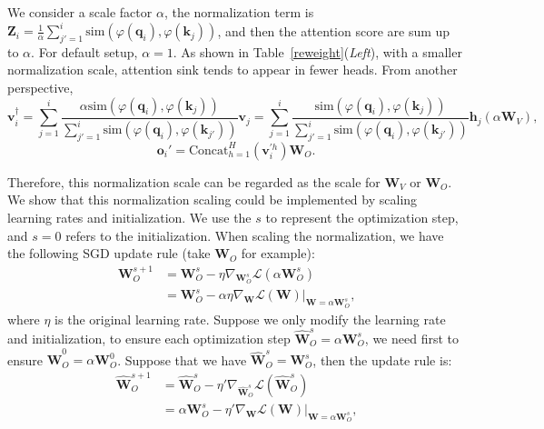 We consider a scale factor $\alpha$, the normalization term is $\boldsymbol{Z}_i=\frac{1}{\alpha}\sum_{j'=1}^i\textrm{sim}(\varphi(\boldsymbol{q}_i)\textrm{,}\,\varphi(\boldsymbol{k}_j))$, and then the attention score are sum up to $\alpha$. For default setup, $\alpha=\textrm{1}$. As shown in Table~\ref{reweight}(\emph{Left}), with a smaller normalization scale, attention sink tends to appear in fewer heads. From another perspective,
\begin{equation}
\boldsymbol{v}_i^{\dagger}=\sum_{j=1}^i\frac{\alpha
\textrm{sim}(\varphi(\boldsymbol{q}_i)\textrm{,}\,\varphi(\boldsymbol{k}_j))}{\sum_{j'=1}^i\textrm{sim}(\varphi(\boldsymbol{q}_i)\textrm{,}\,\varphi(\boldsymbol{k}_{j'}))}\boldsymbol{v}_j=\sum_{j=1}^i\frac{
\textrm{sim}(\varphi(\boldsymbol{q}_i)\textrm{,}\,\varphi(\boldsymbol{k}_j))}{\sum_{j'=1}^i\textrm{sim}(\varphi(\boldsymbol{q}_i)\textrm{,}\,\varphi(\boldsymbol{k}_{j'}))}\boldsymbol{h}_j(\alpha\boldsymbol{W}_V)\textrm{,}
\end{equation}
\begin{equation}
    \boldsymbol{o}_i'=\textrm{Concat}_{h=1}^H (\boldsymbol{v}_i^{'h})\boldsymbol{W}_O\textrm{.}
\end{equation}

Therefore, this normalization scale can be regarded as the scale for $\boldsymbol{W}_V$ or $\boldsymbol{W}_O$. We show that this normalization scaling could be implemented by scaling learning rates and initialization. We use the $s$ to represent the optimization step, and $s=\textrm{0}$ refers to the initialization. When scaling the normalization, we have the following SGD update rule (take $\boldsymbol{W}_O$ for example):
\begin{align}
    \boldsymbol{W}_O^{s+1}&=\boldsymbol{W}_O^{s}-\eta\nabla_{\boldsymbol{W}_O^{s}} \mathcal{L}(\alpha\boldsymbol{W}_O^{s})\\
    &=\boldsymbol{W}_O^{s}-\alpha\eta\nabla_{\boldsymbol{W}} \mathcal{L}(\boldsymbol{W})|_{\boldsymbol{W}=\alpha\boldsymbol{W}_O^{s}}\textrm{,}
\end{align}
where $\eta$ is the original learning rate. Suppose we only modify the learning rate and initialization, to ensure each optimization step $\hat{\boldsymbol{W}}_O^{s}=\alpha\boldsymbol{W}_O^{s}$, we need first to ensure $\hat{\boldsymbol{W}}_O^{0}=\alpha\boldsymbol{W}_O^{0}$. Suppose that we have $\hat{\boldsymbol{W}}_O^{s}=\boldsymbol{W}_O^{s}$, then the update rule is:
\begin{align}
\hat{\boldsymbol{W}}_O^{s+1}&=\hat{\boldsymbol{W}}_O^{s}-\eta'\nabla_{\hat{\boldsymbol{W}}_O^{s}} \mathcal{L}(\hat{\boldsymbol{W}}_O^{s})\\
&=\alpha\boldsymbol{W}_O^{s}-\eta'\nabla_{\boldsymbol{W}} \mathcal{L}(\boldsymbol{W})|_{\boldsymbol{W}=\alpha\boldsymbol{W}_O^{s}}\textrm{,}
\end{align}

